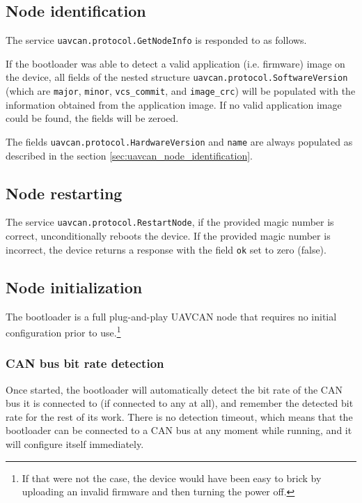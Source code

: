 \documentclass{zubaxdoc}
\begin{document}
\subsection{Node identification}\label{sec:bootloader_uavcan_node_identification}

The service \verb|uavcan.protocol.GetNodeInfo| is responded to as follows.

If the bootloader was able to detect a valid application (i.e. firmware) image on the device,
all fields of the nested structure \verb|uavcan.protocol.SoftwareVersion|
(which are \verb|major|, \verb|minor|, \verb|vcs_commit|, and \verb|image_crc|)
will be populated with the information obtained from the application image.
If no valid application image could be found, the fields will be zeroed.

The fields \verb|uavcan.protocol.HardwareVersion| and \verb|name|
are always populated as described in the section \ref{sec:uavcan_node_identification}.

\subsection{Node restarting}\label{sec:bootloader_uavcan_node_restarting}

The service \verb|uavcan.protocol.RestartNode|, if the provided magic number is correct,
unconditionally reboots the device.
If the provided magic number is incorrect, the device returns a response with the field \verb|ok|
set to zero (false).

\subsection{Node initialization}

The bootloader is a full plug-and-play UAVCAN node that requires no initial configuration prior to
use.\footnote{If that were not the case, the device would have been easy to brick
by uploading an invalid firmware and then turning the power off.}

\subsubsection{CAN bus bit rate detection}

Once started, the bootloader will automatically detect the bit rate of the CAN bus it is connected to
(if connected to any at all), and remember the detected bit rate for the rest of its work.
There is no detection timeout, which means that the bootloader can be connected to a CAN bus at
any moment while running, and it will configure itself immediately.
\end{document}

